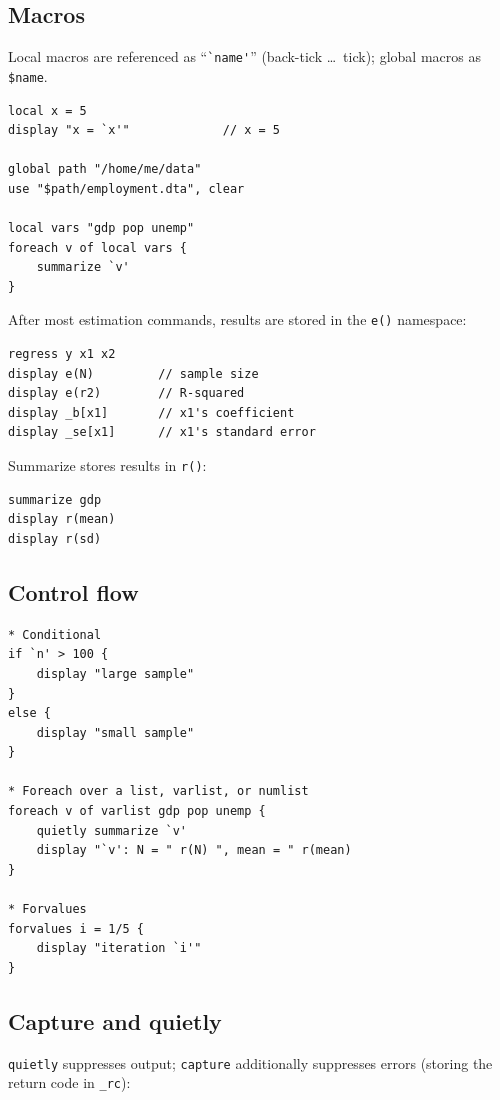 \documentclass[11pt,letterpaper]{article}
\begin{document}
\subsection{Macros}

Local macros are referenced as ``\verb|`name'|'' (back-tick \ldots\ tick);
global macros as \texttt{\$name}.

\begin{lstlisting}
local x = 5
display "x = `x'"             // x = 5

global path "/home/me/data"
use "$path/employment.dta", clear

local vars "gdp pop unemp"
foreach v of local vars {
    summarize `v'
}
\end{lstlisting}

After most estimation commands, results are stored in the \texttt{e()}
namespace:

\begin{lstlisting}
regress y x1 x2
display e(N)         // sample size
display e(r2)        // R-squared
display _b[x1]       // x1's coefficient
display _se[x1]      // x1's standard error
\end{lstlisting}

Summarize stores results in \texttt{r()}:

\begin{lstlisting}
summarize gdp
display r(mean)
display r(sd)
\end{lstlisting}

\subsection{Control flow}

\begin{lstlisting}
* Conditional
if `n' > 100 {
    display "large sample"
}
else {
    display "small sample"
}

* Foreach over a list, varlist, or numlist
foreach v of varlist gdp pop unemp {
    quietly summarize `v'
    display "`v': N = " r(N) ", mean = " r(mean)
}

* Forvalues
forvalues i = 1/5 {
    display "iteration `i'"
}
\end{lstlisting}

\subsection{Capture and quietly}

\texttt{quietly} suppresses output; \texttt{capture} additionally
suppresses errors (storing the return code in \texttt{\_rc}):
\end{document}
